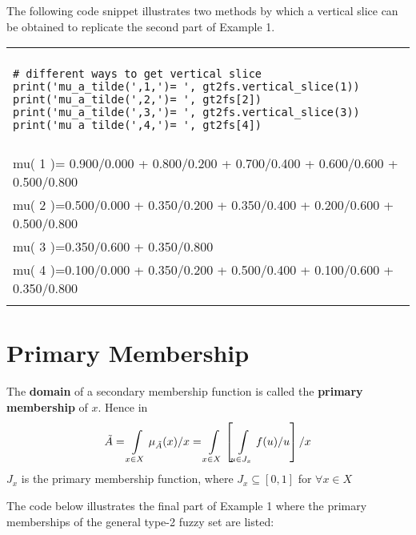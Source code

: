 \documentclass[]{article}
\begin{document}
\bigskip

The following code snippet illustrates two methods by which a vertical slice can be obtained to replicate the second part of Example 1.

\bigskip

\begin{tabular}{|l|}
\hline 
\lstset{language=Python}
\lstset{basicstyle=\scriptsize}
\\
\begin{lstlisting}
# different ways to get vertical slice
print('mu_a_tilde(',1,')= ', gt2fs.vertical_slice(1))
print('mu_a_tilde(',2,')= ', gt2fs[2])
print('mu_a_tilde(',3,')= ', gt2fs.vertical_slice(3))
print('mu_a_tilde(',4,')= ', gt2fs[4])
\end{lstlisting}
\\
\hline
\\
{\small mu( 1 )= 0.900/0.000 + 0.800/0.200 + 0.700/0.400 + 0.600/0.600 + 0.500/0.800}\\
{\small mu( 2 )=0.500/0.000 + 0.350/0.200 + 0.350/0.400 + 0.200/0.600 + 0.500/0.800}\\
{\small mu( 3 )=0.350/0.600 + 0.350/0.800}\\
{\small mu( 4 )=0.100/0.000 + 0.350/0.200 + 0.500/0.400 + 0.100/0.600 + 0.350/0.800}\\
\\ 
\hline 
\end{tabular} 

\section{Primary Membership}
The \textbf{domain} of a secondary membership function is called the \textbf{primary membership} of $x$. Hence in
\[
\tilde{A}=\int\displaylimits_{x \in X} \mu_{ \tilde{A} }(x) /x = \int\displaylimits_{x \in X} \left[  \int\displaylimits_{u\in J_{x}} f(u) / u \right]  /x
\]
$J_{x}$ is the primary membership function, where $J_{x} \subseteq [0,1]$ for $\forall x \in X$

\bigskip

The code below illustrates the final part of Example 1 where the primary memberships of the general type-2 fuzzy set are listed:

\bigskip
\end{document}
